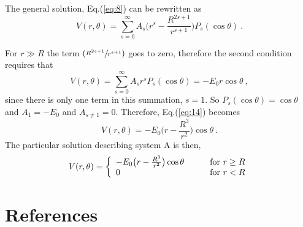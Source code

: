 \documentclass[a4paper]{jpconf}
\begin{document}
The general solution, Eq.(\ref{eq:8}) can be rewritten as
\begin{equation}
V(r,\theta) = \sum_{s=0}^{\infty} A_s \bigg(r^s - \frac{R^{2s+1}}{r^{s+1}}\bigg) P_s (\cos \theta)~.
\end{equation}

For $r\gg R$ the term $(\sfrac{R^{2s+1}}{r^{s+1}})$ goes to zero, therefore the second condition requires that
\begin{equation}
V(r,\theta)=\sum_{s=0}^{\infty} A_s r^s P_s(\cos \theta) = -E_0 r \cos \theta~,
\label{eq:14}
\end{equation}since there is only one term in this summation, $s=1$. So $P_s(\cos \theta)= \cos \theta$ and $A_1 = -E_0$ and $A_{s \ne 1} = 0$. Therefore, Eq.(\ref{eq:14}) becomes
\begin{equation}
V(r,\theta) = -E_0 \bigg(r - \frac{R^3}{r^2}\bigg) \cos \theta~.
\end{equation}
The particular solution describing system A is then,
\begin{equation}
V(r,\theta) = \left\{ 
  \begin{array}{l l}
   -E_0 \big(r - \frac{R^3}{r^2}\big) \cos \theta  & \qquad \text{for $r \geq R$}\\
    0 & \qquad \text{for $r < R$}
  \end{array} \right.
\end{equation}


\section*{References}


\end{document}
